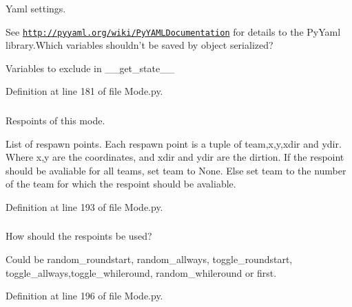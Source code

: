 Yaml settings. 

See \href{http://pyyaml.org/wiki/PyYAMLDocumentation}{\tt http://pyyaml.org/wiki/PyYAMLDocumentation} for details to the PyYaml library.Which variables shouldn't be saved by object serialized?

Variables to exclude in \_\-\_\-get\_\-state\_\-\_\- 

Definition at line 181 of file Mode.py.

\hypertarget{class_mode_1_1_mode_a2e07ed5d08d3ced387d24587f8a87967}{
\subsubsection[{\_\-\_\-respoints}]{}}
\label{class_mode_1_1_mode_a2e07ed5d08d3ced387d24587f8a87967}


Respoints of this mode. 

List of respawn points. Each respawn point is a tuple of team,x,y,xdir and ydir. Where x,y are the coordinates, and xdir and ydir are the dirtion. If the respoint should be avaliable for all teams, set team to None. Else set team to the number of the team for which the respoint should be avaliable. 

Definition at line 193 of file Mode.py.

\hypertarget{class_mode_1_1_mode_a1fd32aea9872573e444d08b65ec28ef2}{
\subsubsection[{\_\-\_\-restype}]{}}
\label{class_mode_1_1_mode_a1fd32aea9872573e444d08b65ec28ef2}


How should the respoints be used? 

Could be random\_\-roundstart, random\_\-allways, toggle\_\-roundstart, toggle\_\-allways,toggle\_\-whileround, random\_\-whileround or first. 

Definition at line 196 of file Mode.py.

